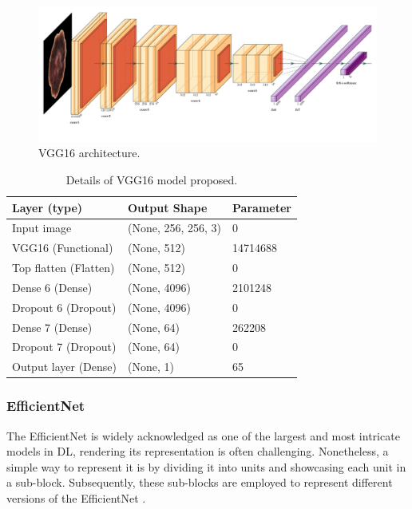 \documentclass[12pt]{diazessay}
\begin{document}
    \begin{figure}[H]
        \centering
        \includegraphics[width=17cm]{Architectures figures/VGG16.pdf}
        \caption[VGG16 architecture]{VGG16 architecture.}
    \end{figure}


     \begin{table}[H]
        \begin{center}
        \begin{tabular}{lll}
            \hline
            \textbf{ Layer (type)} & \textbf{Output Shape} & \textbf{Parameter} \\
            \hline
            Input image & (None, 256, 256, 3) & 0 \\
            VGG16 (Functional) & (None, 512)   & 14714688 \\
            Top flatten (Flatten) & (None, 512) & 0 \\
            Dense 6 (Dense) & (None, 4096) & 2101248 \\
            Dropout 6 (Dropout) & (None, 4096) & 0 \\
            Dense 7 (Dense) & (None, 64) & 262208\\
            Dropout 7 (Dropout) & (None, 64) & 0\\
            Output layer (Dense)  & (None, 1)  & 65\\
        \hline
        \end{tabular}
        \end{center}
        \caption[Details of VGG16 Model Proposed]{\centering Details of VGG16 model proposed.}
    \end{table}



    \subsubsection{EfficientNet}
    \hspace{0.7cm} The EfficientNet is widely acknowledged as one of the largest and most intricate models in DL, rendering its representation is often challenging. Nonetheless, a simple way to represent it is by dividing it into units and showcasing each unit in a sub-block. Subsequently, these sub-blocks are employed to represent different versions of the EfficientNet \cite{agarwal2020complete}.
\end{document}
